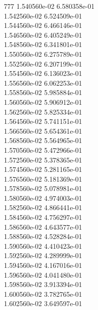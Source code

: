 777	1.540560e-02	6.580358e-01	\\ 	1.542560e-02	6.524509e-01	\\ 	1.544560e-02	6.466146e-01	\\ 	1.546560e-02	6.405249e-01	\\ 	1.548560e-02	6.341801e-01	\\ 	1.550560e-02	6.275789e-01	\\ 	1.552560e-02	6.207199e-01	\\ 	1.554560e-02	6.136023e-01	\\ 	1.556560e-02	6.062253e-01	\\ 	1.558560e-02	5.985884e-01	\\ 	1.560560e-02	5.906912e-01	\\ 	1.562560e-02	5.825334e-01	\\ 	1.564560e-02	5.741151e-01	\\ 	1.566560e-02	5.654361e-01	\\ 	1.568560e-02	5.564965e-01	\\ 	1.570560e-02	5.472966e-01	\\ 	1.572560e-02	5.378365e-01	\\ 	1.574560e-02	5.281165e-01	\\ 	1.576560e-02	5.181369e-01	\\ 	1.578560e-02	5.078981e-01	\\ 	1.580560e-02	4.974003e-01	\\ 	1.582560e-02	4.866441e-01	\\ 	1.584560e-02	4.756297e-01	\\ 	1.586560e-02	4.643577e-01	\\ 	1.588560e-02	4.528284e-01	\\ 	1.590560e-02	4.410423e-01	\\ 	1.592560e-02	4.289999e-01	\\ 	1.594560e-02	4.167016e-01	\\ 	1.596560e-02	4.041480e-01	\\ 	1.598560e-02	3.913394e-01	\\ 	1.600560e-02	3.782765e-01	\\ 	1.602560e-02	3.649597e-01	\\ \hline
\\ \hline
